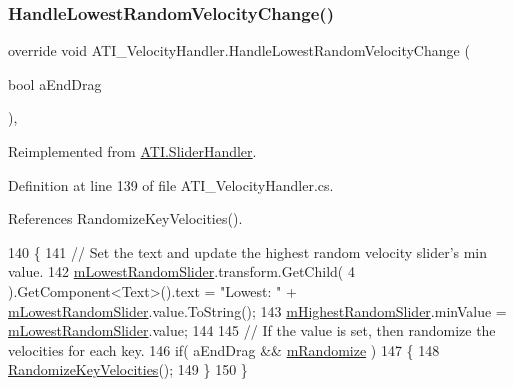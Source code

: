 \subsubsection{\texorpdfstring{Handle\+Lowest\+Random\+Velocity\+Change()}{HandleLowestRandomVelocityChange()}}
{\footnotesize\ttfamily override void A\+T\+I\+\_\+\+Velocity\+Handler.\+Handle\+Lowest\+Random\+Velocity\+Change (\begin{DoxyParamCaption}\item[{bool}]{a\+End\+Drag }\end{DoxyParamCaption})\hspace{0.3cm}{\ttfamily [protected]}, {\ttfamily [virtual]}}



Reimplemented from \hyperlink{class_a_t_i_1_1_slider_handler_a710b59b6e8bf059af76477a930572d9e}{A\+T\+I.\+Slider\+Handler}.



Definition at line 139 of file A\+T\+I\+\_\+\+Velocity\+Handler.\+cs.



References Randomize\+Key\+Velocities().


\begin{DoxyCode}
140     \{
141         \textcolor{comment}{// Set the text and update the highest random velocity slider's min value.}
142         \hyperlink{class_a_t_i___velocity_handler_aba4ceb157ad404a47cedb3583e81d194}{mLowestRandomSlider}.transform.GetChild( 4 ).GetComponent<Text>().text = \textcolor{stringliteral}{"Lowest:
       "} + \hyperlink{class_a_t_i___velocity_handler_aba4ceb157ad404a47cedb3583e81d194}{mLowestRandomSlider}.value.ToString();
143         \hyperlink{class_a_t_i___velocity_handler_aec243511d869243292e215a24e87f192}{mHighestRandomSlider}.minValue = \hyperlink{class_a_t_i___velocity_handler_aba4ceb157ad404a47cedb3583e81d194}{mLowestRandomSlider}.value;
144 
145         \textcolor{comment}{// If the value is set, then randomize the velocities for each key.}
146         \textcolor{keywordflow}{if}( aEndDrag && \hyperlink{class_a_t_i___velocity_handler_aa6f4ac16382d37eb2c66fb358ac87301}{mRandomize} )
147         \{
148             \hyperlink{class_a_t_i___velocity_handler_aa1a10281dafc6666677e4255ad663dde}{RandomizeKeyVelocities}();
149         \}
150     \}
\end{DoxyCode}
\mbox{\label{class_a_t_i___velocity_handler_a5b00635239f4f10aaefc5898a8f1b975}} 
